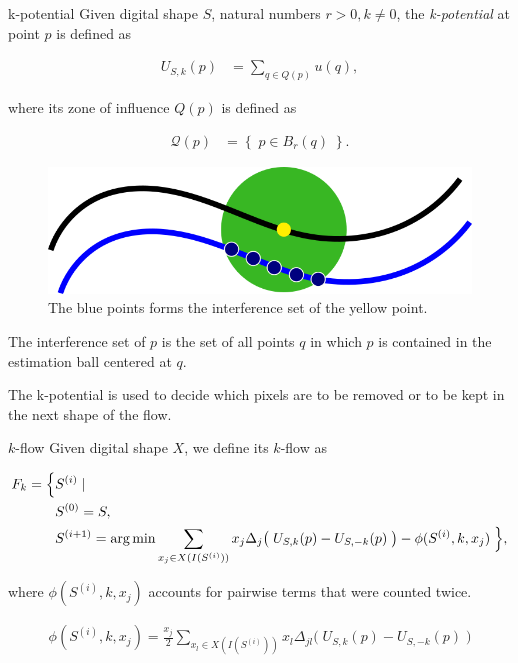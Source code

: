 \begin{definition}{k-potential}
Given digital shape $S$, natural numbers $r>0, k \neq 0$, the \emph{k-potential} at point $p$ is defined as

\begin{align*}
	U_{S,k}(p) &= \sum_{q \in Q(p)}{ u(q),}
\end{align*}

where its zone of influence $Q(p)$ is defined as

\begin{align*}
	\mathcal{Q}(p) &= \left\{\; p \in B_r(q) \; \right\}.
\end{align*}

\end{definition}

\begin{figure}[h!]
\center
\includegraphics[scale=0.5]{figures/appendix-potential-elastica/k-potential.png}
\caption{The blue points forms the interference set of the yellow point.}
\label{fig:unbalance-set}
\end{figure}

The interference set of $p$ is the set of all points $q$ in which $p$ is contained in the estimation ball centered at $q$.   







The k-potential is used to decide which pixels are to be removed or to be kept in the next shape of the flow. 


\begin{definition}{$k$-flow}
	Given digital shape $X$, we define its $k$-flow as
	
	\begin{align*}
		F_k = \Big\{& S^{(i)} \; | \\
			& S^{(0)} = S,\\
		    &S^{(i+1)} = \operatorname*{arg\,min} \sum_{ x_j \in X(I(S^{(i)}))}{ x_j \Delta _j\big(\; U_{S,k}(p) - U_{S,-k}(p) \;\big)} - \phi(S^{(i)},k,x_j) \; \Big\},
	\end{align*}
	
	where $\phi(S^{(i)},k,x_j)$ accounts for pairwise terms that were counted twice.
	
	\begin{align*}
	\phi(S^{(i)},k,x_j) = \frac{x_j}{2}\sum_{ x_l \in X(I(S^{(i)}))}{x_l \Delta _{jl}\big(\; U_{S,k}(p) - U_{S,-k}(p) \;\big)} 
	\end{align*}
     	  
\end{definition}	

